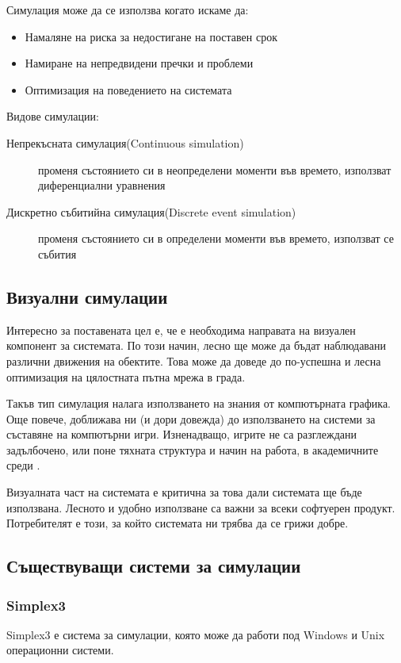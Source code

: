 		Симулация може да се използва когато искаме да:
		
		\begin{itemize}
		\item Намаляне на риска за недостигане на поставен срок		
 		\item Намиране на непредвидени пречки и проблеми
 		\item Оптимизация на поведението на системата
		\end{itemize}
		
		Видове симулации:
		
		\begin{description}
		\item[Непрекъсната симулация(Continuous simulation)] променя състоянието си в неопределени моменти във времето, използват диференциални уравнения
		\item[Дискретно събитийна симулация(Discrete event simulation)] променя състоянието си в определени моменти във времето, използват се събития
		\end{description}
		
	\subsection{Визуални симулации}
		Интересно за поставената цел е, че е необходима направата на визуален компонент за системата.
		По този начин, лесно ще може да бъдат наблюдавани различни движения на обектите. Това може да 
		доведе до по-успешна и лесна оптимизация на цялостната пътна мрежа в града.
		
		Такъв тип симулация налага използването на знания от компютърната графика. 
		Още повече, доближава ни (и дори довежда) до използването на системи за съставяне на компютърни игри. 
		Изненадващо, игрите не са разглеждани задълбочено, или поне тяхната структура и начин на работа, в академичните среди \cite{Holzkorn}.
		
		Визуалната част на системата е критична за това дали системата ще бъде използвана.
		Лесното и удобно използване са важни за всеки софтуерен продукт. 
		Потребителят е този, за който системата ни трябва да се грижи добре. \cite{Microsoft}
	
	\subsection{Съществуващи системи за симулации}
		\subsubsection{Simplex3}
			Simplex3 е система за симулации, която може да работи под Windows и Unix операционни системи.
			
